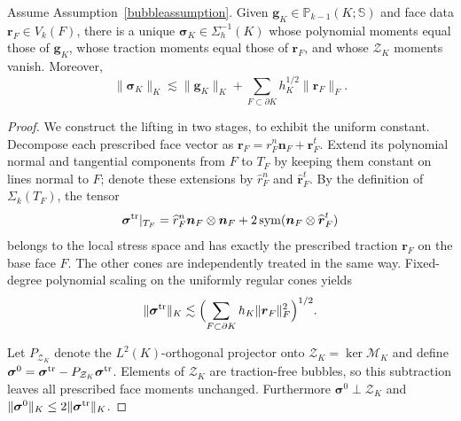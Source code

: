 \documentclass[review,hidelinks,onefignum,onetabnum]{siamart251216}
\newcommand{\sym}{\operatorname{sym}}
\begin{document}
\begin{lemma}\label{lem:stable-local-lifting}
Assume Assumption~\ref{bubbleassumption}.  Given
$\boldsymbol g_K\in\mathbb P_{k-1}(K;\mathbb S)$ and face data
$\boldsymbol r_F\in V_k(F)$, there is a unique
$\boldsymbol\sigma_K\in\Sigma_h^{-1}(K)$ whose polynomial moments equal
those of $\boldsymbol g_K$, whose traction moments equal those of
$\boldsymbol r_F$, and whose $\mathcal Z_K$ moments vanish. Moreover,
\begin{equation}\label{eq:stable-local-lifting}
\|\boldsymbol\sigma_K\|_K\lesssim
\|\boldsymbol g_K\|_K+
\sum_{F\subset\partial K}h_K^{1/2}\|\boldsymbol r_F\|_F .
\end{equation}
\end{lemma}
\begin{proof}
We construct the lifting in two stages, to exhibit the uniform
constant. Decompose each prescribed face vector as
$\boldsymbol r_F=r_F^n\boldsymbol n_F+\boldsymbol r_F^t$.
Extend its polynomial normal and tangential components from $F$ to
$T_F$ by keeping them constant on lines normal to $F$; denote these
extensions by $\widehat r_F^n$ and $\widehat{\boldsymbol r}_F^t$.
By the definition of $\Sigma_k(T_F)$, the tensor
\[
 \boldsymbol\sigma^{\rm tr}|_{T_F}
 =\widehat r_F^n\boldsymbol n_F\otimes\boldsymbol n_F
 +2\sym(\boldsymbol n_F\otimes
 \widehat{\boldsymbol r}_F^t)
\]
belongs to the local stress space and has exactly the prescribed
traction $\boldsymbol r_F$ on the base face $F$. The other cones
are independently treated in the same way. Fixed-degree polynomial
scaling on the uniformly regular cones yields
\begin{equation}\label{eq:trace-lift-bound}
 \|\boldsymbol\sigma^{\rm tr}\|_K
 \lesssim
 \Bigl(\sum_{F\subset\partial K}h_K\|\boldsymbol r_F\|_F^2
 \Bigr)^{1/2}.
\end{equation}

Let $P_{\mathcal Z_K}$ denote the $L^2(K)$-orthogonal projector onto
$\mathcal Z_K=\ker\mathcal M_K$ and define
$\boldsymbol\sigma^0=\boldsymbol\sigma^{\rm tr}
 -P_{\mathcal Z_K}\boldsymbol\sigma^{\rm tr}$.
Elements of $\mathcal Z_K$ are traction-free bubbles, so this
subtraction leaves all prescribed face moments unchanged.
Furthermore $\boldsymbol\sigma^0\perp\mathcal Z_K$ and
$\|\boldsymbol\sigma^0\|_K\le2\|\boldsymbol\sigma^{\rm tr}\|_K$.


\end{proof}
\end{document}
